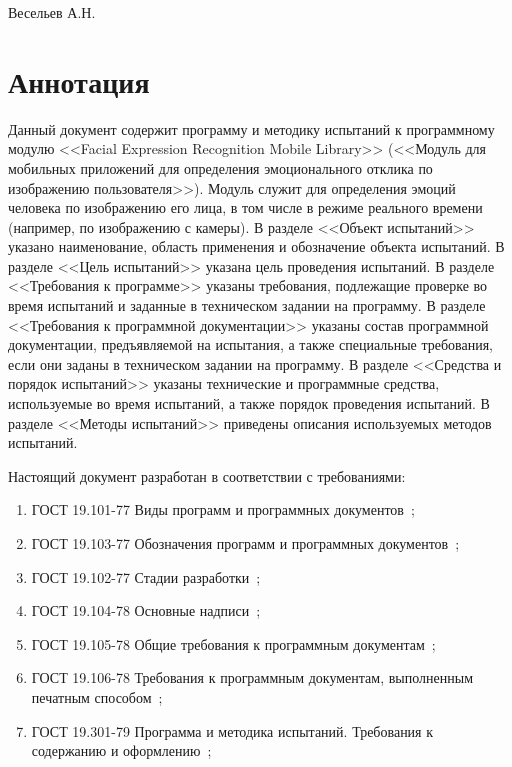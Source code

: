 \documentclass[a4paper,12pt]{article}
\begin{document}
    {Весельев А.Н.}
    \firstPage
    \newpage
    \annotation
    \section*{Аннотация}
    Данный документ содержит программу и методику испытаний к программному модулю <<Facial Expression Recognition Mobile Library>> (<<Модуль для мобильных приложений для определения эмоционального отклика по изображению пользователя>>).
    Модуль служит для определения эмоций человека по изображению его лица, в том числе в режиме реального времени (например, по изображению с камеры).
    В разделе <<Объект испытаний>> указано наименование, область применения и обозначение объекта испытаний.
    В разделе <<Цель испытаний>> указана цель проведения испытаний.
    В разделе <<Требования к программе>> указаны требования, подлежащие проверке во время испытаний и заданные в техническом задании на программу.
    В разделе <<Требования к программной документации>> указаны состав программной документации, предъявляемой на испытания, а также специальные требования, если они заданы в техническом задании на программу.
    В разделе <<Средства и порядок испытаний>> указаны технические и программные средства, используемые во время испытаний, а также порядок проведения испытаний.
    В разделе <<Методы испытаний>> приведены описания используемых методов испытаний.

    Настоящий документ разработан в соответствии с требованиями:
    \begin{enumerate}
        \item ГОСТ 19.101-77 Виды программ и программных документов~\cite{gost1};
        \item ГОСТ 19.103-77 Обозначения программ и программных документов~\cite{gost2};
        \item ГОСТ 19.102-77 Стадии разработки~\cite{gost3};
        \item ГОСТ 19.104-78 Основные надписи~\cite{gost4};
        \item ГОСТ 19.105-78 Общие требования к программным документам~\cite{gost5};
        \item ГОСТ 19.106-78 Требования к программным документам, выполненным печатным способом~\cite{gost6};
        \item ГОСТ 19.301-79 Программа и методика испытаний. Требования к содержанию и оформлению~\cite{gost9};
    \end{enumerate}
\end{document}
